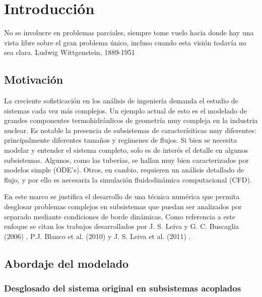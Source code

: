 \chapter{Introducción}
\label{chap1}
\chapterquote
{No se involucre en problemas parciales,
siempre tome vuelo hacia donde hay una vista libre sobre el gran problema único,
incluso cuando esta visión todavía no sea clara.}
{Ludwig Wittgenstein, 1889-1951}

\section{Motivación}
\label{1:motivacion}

La creciente sofisticación en los análisis de ingeniería demanda el estudio de sistemas cada vez más complejos.
Un ejemplo actual de esto es el modelado de grandes componentes termohidráulicos de geometría muy compleja en la industria nuclear. 
Es notable la presencia de subsistemas de caracterísiticas muy diferentes: principalmente diferentes tamaños y regímenes de flujos. 
Si bien se necesita modelar y entender el sistema completo, solo es de interés el detalle en algunos subsistemas. 
Algunos, como las tuberías, se hallan muy bien caracterizados por modelos simple (ODE's).
Otros, en cambio, requieren un análisis detallado de flujo, y por ello es necesaria la simulación fluidodinámica computacional (CFD).

En este marco se justifica el desarrollo de una técnica numérica que permita desglosar problemas complejos 
en subsistemas que puedan ser analizados por separado mediante condiciones de borde dinámicas.
Como referencia a este enfoque se citan los trabajos desarrollados por J. S. Leiva y G. C. Buscaglia (2006) \cite{coup-0d3d}, P.J. Blanco et al. (2010) \cite{coup-black} y J. S. Leiva et al. (2011) \cite{coup-hyd}.

\section{Abordaje del modelado}
\label{1:abordaje}

\subsection*{Desglosado del sistema original en subsistemas acoplados}
\label{1:acoplamiento}

